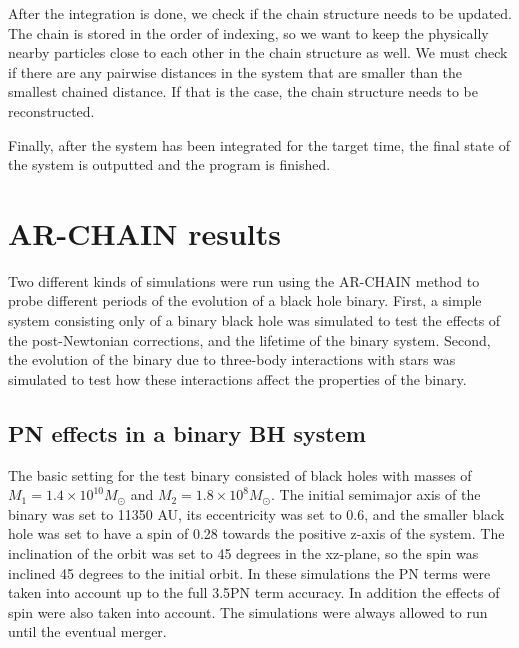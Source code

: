 \documentclass[english, oneside]{HYgradu}
\begin{document}
After the integration is done, we check if the chain structure needs to be updated. The chain is stored in the order of indexing, so we want to keep the physically nearby particles close to each other in the chain structure as well. We must check if there are any pairwise distances in the system that are smaller than the smallest chained distance. If that is the case, the chain structure needs to be reconstructed.

Finally, after the system has been integrated for the target time, the final state of the system is outputted and the program is finished.


\chapter{AR-CHAIN results}

Two different kinds of simulations were run using the AR-CHAIN method to probe different periods of the evolution of a black hole binary. First, a simple system consisting only of a binary black hole was simulated to test the effects of the post-Newtonian corrections, and the lifetime of the binary system. Second, the evolution of the binary due to three-body interactions with stars was simulated to test how these interactions affect the properties of the binary.

\section{PN effects in a binary BH system}

The basic setting for the test binary consisted of black holes with masses of $M_1 = 1.4 \times 10^{10} M_\odot$ and $M_2 = 1.8 \times 10^{8} M_\odot$. The initial semimajor axis of the binary was set to 11350 AU, its eccentricity was set to 0.6, and the smaller black hole was set to have a spin of 0.28 towards the positive z-axis of the system. The inclination of the orbit was set to 45 degrees in the xz-plane, so the spin was inclined 45 degrees to the initial orbit. In these simulations the PN terms were taken into account up to the full 3.5PN term accuracy. In addition the effects of spin were also taken into account. The simulations were always allowed to run until the eventual merger.
\end{document}
